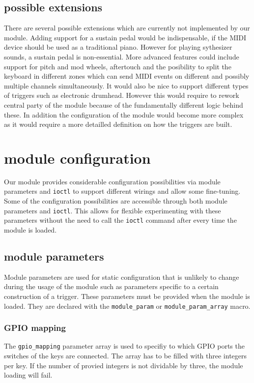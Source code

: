\documentclass[paper=a4,fontsize=11pt,twocolumn,pagesize,bibtotoc]{scrartcl}
\begin{document}
\subsection{possible extensions}
There are several possible extensions which are currently not implemented by our module. Adding support for a sustain pedal would be indispensable, if the MIDI device should be used as a traditional piano. However for playing sythesizer sounds, a sustain pedal is non-essential. More advanced features could include support for pitch and mod wheels, aftertouch and the posibility to split the keyboard in different zones which can send MIDI events on different and possibly multiple channels simultaneously.
It would also be nice to support different types of triggers such as electronic drumhead. However this would require to rework central party of the module because of the fundamentally different logic behind these. In addition the configuration of the module would become more complex as it would require a more detailled definition on how the triggers are built.

\section{module configuration}
Our module provides considerable configuration possibilities via module parameters and \texttt{ioctl} to support different wirings and allow some fine-tuning. Some of the configuration possibilities are accessible through both module parameters and \texttt{ioctl}. This allows for flexible experimenting with these parameters without the need to call the \texttt{ioctl} command after every time the module is loaded.

\subsection{module parameters}
Module parameters are used for static configuration that is unlikely to change during the usage of the module such as parameters specific to a certain construction of a trigger. These parameters must be provided when the module is loaded. They are declared with the \texttt{module\_param} or \texttt{module\_param\_array} macro.

\subsubsection{GPIO mapping}
The \texttt{gpio\_mapping} parameter array is used to specifiy to which GPIO ports the switches of the keys are connected. The array has to be filled with three integers per key. If the number of provied integers is not dividable by three, the module loading will fail.
\end{document}
